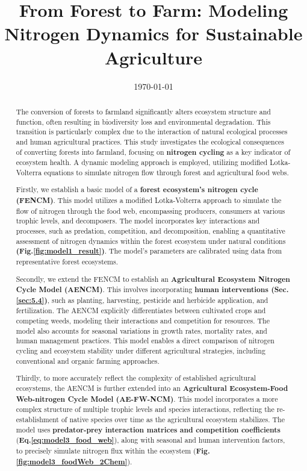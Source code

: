 \documentclass{mcmthesis}
\title{From Forest to Farm: Modeling Nitrogen Dynamics
for Sustainable Agriculture}
\date{\today}
\begin{document}
\begin{abstract}
The conversion of forests to farmland significantly alters ecosystem structure and function, often resulting in biodiversity loss and environmental degradation.  This transition is particularly complex due to the interaction of natural ecological processes and human agricultural practices.  This study investigates the ecological consequences of converting forests into farmland, focusing on \textbf{nitrogen cycling} as a key indicator of ecosystem health.  A dynamic modeling approach is employed, utilizing modified Lotka-Volterra equations to simulate nitrogen flow through forest and agricultural food webs.
\par Firstly, we establish a basic model of a \textbf{forest ecosystem's nitrogen cycle (FENCM)}.  This model utilizes a modified Lotka-Volterra approach to simulate the flow of nitrogen through the food web, encompassing producers, consumers at various trophic levels, and decomposers.  The model incorporates key interactions and processes, such as predation, competition, and decomposition, enabling a quantitative assessment of nitrogen dynamics within the forest ecosystem under natural conditions \textbf{(Fig.\ref{fig:model1_result})}. 
The model's parameters are calibrated using data from representative forest ecosystems.

Secondly, we extend the FENCM to establish an \textbf{Agricultural Ecosystem Nitrogen Cycle Model (AENCM)}. This involves incorporating \textbf{human interventions (Sec.\ref{sec:5.4})}, such as planting, harvesting, pesticide and herbicide application, and fertilization.  The AENCM explicitly differentiates between cultivated crops and competing weeds, modeling their interactions and competition for resources. The model also accounts for seasonal variations in growth rates, mortality rates, and human management practices.  This model enables a direct comparison of nitrogen cycling and ecosystem stability under different agricultural strategies, including conventional and organic farming approaches.

Thirdly, to more accurately reflect the complexity of established agricultural ecosystems, the AENCM is further extended into an \textbf{Agricultural Ecosystem-Food Web-nitrogen Cycle Model (AE-FW-NCM)}. This model incorporates a more complex structure of multiple trophic levels and species interactions, reflecting the re-establishment of native species over time as the agricultural ecosystem stabilizes.  The model uses \textbf{predator-prey interaction matrices and competition coefficients }(\textbf{Eq.\ref{eq:model3_food_web}}), along with seasonal and human intervention factors, to precisely simulate nitrogen flux within the ecosystem (\textbf{Fig.\ref{fig:model3_foodWeb_2Chem}}).



\end{abstract}
\end{document}
